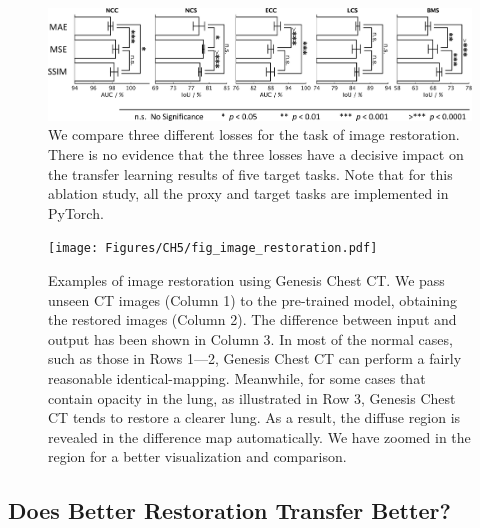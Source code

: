 
\begin{figure}
\begin{center}
\includegraphics[width=0.9\columnwidth]{Figures/CH5/fig_losses.pdf}
\caption[Assessment the Restoration Loss and Model Transferability]{
We compare three different losses for the task of image restoration. There is no evidence that the three losses have a decisive impact on the transfer learning results of five target tasks. Note that for this ablation study, all the proxy and target tasks are implemented in PyTorch.
}
\label{ch5:fig:losses}
\end{center}
\end{figure}


\begin{figure}[t]
\centering
\texttt{[image: Figures/CH5/fig\_image\_restoration.pdf]}
\caption[Models Genesis Can Detect Infected Regions from Images]{
Examples of image restoration using Genesis Chest CT. We pass unseen CT images (Column 1) to the pre-trained model, obtaining the restored images (Column 2). The difference between input and output has been shown in Column 3. In most of the normal cases, such as those in Rows 1---2, Genesis Chest CT can perform a fairly reasonable identical-mapping. Meanwhile, for some cases that contain opacity in the lung, as illustrated in Row 3, Genesis Chest CT tends to restore a clearer lung. As a result, the diffuse region is revealed in the difference map automatically. We have zoomed in the region for a better visualization and comparison.
}
\label{ch5:fig:image_restoration}
\end{figure}
    
    
\subsection{Does Better Restoration Transfer Better?}
\label{ch5:restoration_loss}

